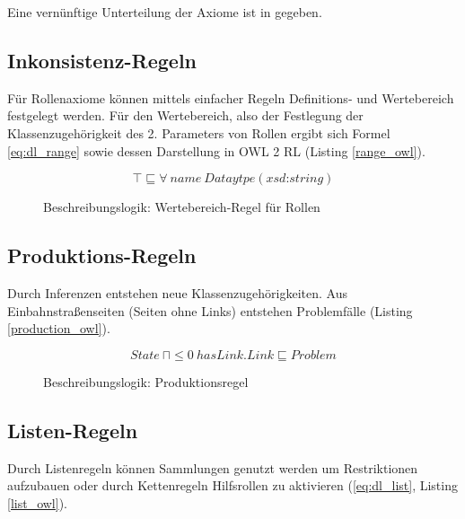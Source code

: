 \documentclass[runningheads,a4paper]{llncs}
\begin{document}
Eine vernünftige Unterteilung der Axiome ist in \cite{owl2rif} gegeben. 


\subsection{Inkonsistenz-Regeln}

Für Rollenaxiome können mittels einfacher Regeln Definitions- und Wertebereich festgelegt werden. 
Für den Wertebereich, also der Festlegung der Klassenzugehörigkeit des 2. Parameters von Rollen ergibt sich Formel \eqref{eq:dl_range} sowie dessen Darstellung in OWL 2 RL (Listing \ref{range_owl}).

\begin{figure}
\begin{equation}
\top \sqsubseteq \forall\ name\ Dataytpe(\textit{xsd:string})
\label{eq:dl_range}
\end{equation}
\caption{Beschreibungslogik: Wertebereich-Regel für Rollen}
\end{figure}



\subsection{Produktions-Regeln}

Durch Inferenzen entstehen neue Klassenzugehörigkeiten. 
Aus Einbahnstraßenseiten (Seiten ohne Links) entstehen Problemfälle (Listing \ref{production_owl}). 
\begin{figure}
\begin{equation}
State\ \sqcap \leq 0\ hasLink.Link \sqsubseteq Problem
\label{eq:dl_infered}
\end{equation}
\caption{Beschreibungslogik: Produktionsregel}
\end{figure}



\subsection{Listen-Regeln}
Durch Listenregeln können Sammlungen genutzt werden um Restriktionen aufzubauen oder durch Kettenregeln Hilfsrollen zu aktivieren (\eqref{eq:dl_list}, Listing \ref{list_owl}).
\end{document}
